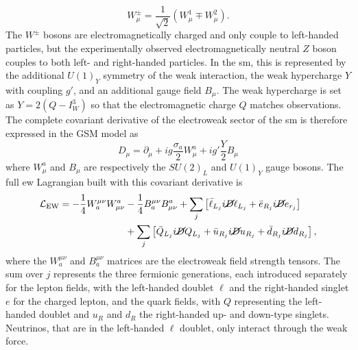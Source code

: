 \begin{equation}\label{eq-weak-lic}
    W_{\mu}^{\pm} = \frac{1}{\sqrt{2}} \left(W_{\mu}^{1} \mp W_{\mu}^{2} \right).
\end{equation}
The $W^{\pm}$ bosons are electromagnetically charged and only couple to left-handed particles, but the experimentally observed electromagnetically neutral $Z$ boson couples to both left- and right-handed particles. In the \gls{sm}, this is represented by the additional $U(1)_Y$ symmetry of the weak interaction, the weak hypercharge $Y$ with coupling $g'$, and an additional gauge field $B_{\mu}$. The weak hypercharge is set as $Y = 2 (Q - I_W^3)$ so that the electromagnetic charge $Q$ matches observations. The complete covariant derivative of the electroweak sector of the \gls{sm} is therefore expressed in the GSM model as 
\begin{equation}\label{eq-GaugeEW}
    D_{\mu}  = \partial_{\mu} + ig \frac{\sigma_a}{2} W_{\mu}^a + ig' \frac{Y}{2} B_{\mu}
\end{equation}
where $W_{\mu}^a$ and $B_{\mu}$ are respectively the $SU(2)_L$ and $U(1)_Y$ gauge bosons. The full \gls{ew} Lagrangian built with this covariant derivative is
\begin{equation}\label{eq-EWlag}
    \begin{split}
        \mathcal{L}_{\text{EW}} = - \frac{1}{4} W_a^{\mu\nu} W^a_{\mu\nu} &- \frac{1}{4} B_a^{\mu\nu} B^a_{\mu\nu} + \sum_{j} \left[ \bar{\ell}_{L_j}i\cancel{D}\ell_{L_j} + \bar{e}_{R_j}i\cancel{D}e_{r_j}  \right] \\
        &+ \sum_{j} \left[ \bar{Q}_{L_j}i\cancel{D}Q_{L_j} + \bar{u}_{R_j}i\cancel{D}u_{R_j} + \bar{d}_{R_j}i\cancel{D}d_{R_j} \right],
    \end{split}
\end{equation}
where the $W_a^{\mu\nu}$ and $B_a^{\mu\nu}$ matrices are the electroweak field strength tensors. The sum over $j$ represents the three fermionic generations, each introduced separately for the lepton fields, with the left-handed doublet $\ell$ and the right-handed singlet $e$ for the charged lepton, and the quark fields, with $Q$ representing the left-handed doublet and $u_R$ and $d_R$ the right-handed up- and down-type singlets. Neutrinos, that are in the left-handed $\ell$ doublet, only interact through the weak force. \\

